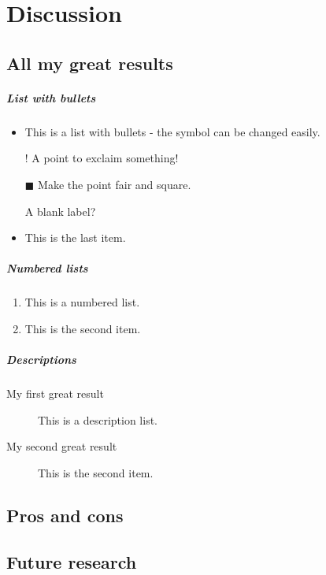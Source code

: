 \chapter{Discussion}
\label{discussion}
\kant[15] %
\section{All my great results}
\kant[16]
\paragraph{List with bullets}
\begin{itemize}
    \item This is a list with bullets - the symbol can be changed easily.
     \item[!] A point to exclaim something!
  \item[$\blacksquare$] Make the point fair and square.
  \item[] A blank label?
    \item This is the last item.
\end{itemize}
\paragraph{Numbered lists}
\begin{enumerate}
    \item This is a numbered list.
     \item This is the second item.
\end{enumerate}
\paragraph{Descriptions}
\begin{description}
\item[My first great result] This is a description list.
 \item[My second great result] This is the second item.
\end{description}
\section{Pros and cons}
\kant[17]
\section{Future research}
\kant[18]